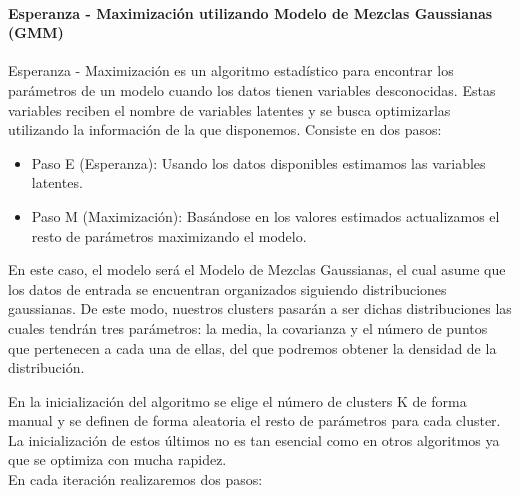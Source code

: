 \documentclass[conference,a4paper]{IEEEtran}
\begin{document}
\paragraph{\textbf{Esperanza - Maximización utilizando Modelo de Mezclas Gaussianas (GMM)}}

Esperanza - Maximización es un algoritmo estadístico para encontrar los parámetros de un modelo cuando los datos tienen variables desconocidas. Estas variables reciben el nombre de variables latentes y se busca optimizarlas utilizando la información de la que disponemos. Consiste en dos pasos:
\begin{itemize}
	\item Paso E (Esperanza): Usando los datos disponibles estimamos las variables latentes.\\
	\item Paso M (Maximización): Basándose en los valores estimados actualizamos el resto de parámetros maximizando el modelo.
\end{itemize}

En este caso, el modelo será el Modelo de Mezclas Gaussianas, el cual asume que los datos de entrada se encuentran organizados siguiendo distribuciones gaussianas. De este modo, nuestros clusters pasarán a ser dichas distribuciones las cuales tendrán tres parámetros: la media, la covarianza y el número de puntos que pertenecen a cada una de ellas, del que podremos obtener la densidad de la distribución.

En la inicialización del algoritmo se elige el número de clusters K de forma manual y se definen de forma aleatoria el resto de parámetros para cada cluster. La inicialización de estos últimos no es tan esencial como en otros algoritmos ya que se optimiza con mucha rapidez.\\
En cada iteración realizaremos dos pasos:
\end{document}
